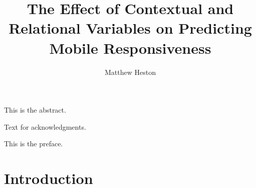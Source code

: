 \documentclass[12pt]{nuthesis}	%
\author{Matthew Heston}
\title{The Effect of Contextual and Relational Variables on Predicting Mobile Responsiveness}
\begin{document}
%	
%


\frontmatter		%

\maketitle		%

\copyrightpage		%


\abstract		%

This is the abstract.

\acknowledgements	%

Text for acknowledgments.

\preface		%

This is the preface.


%
%
%
%
%
%
%
%

\clearpage{} %
\tableofcontents	%

\clearpage{} %
\listoftables		%

\clearpage{} %
\listoffigures		%



\mainmatter             %



\chapter{Introduction}
\end{document}

